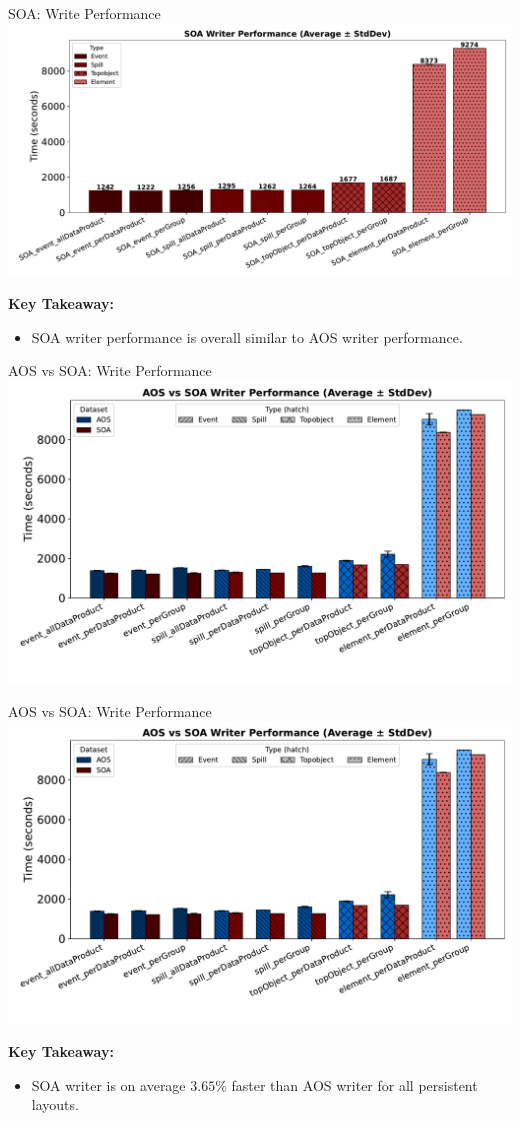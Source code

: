 \documentclass[aspectratio=169]{beamer}
\begin{document}
\begin{frame}{SOA: Write Performance}
  \centering
  \includegraphics[width=0.5\linewidth]{../experiments/Seaborn/SOAWriter_shaded.pdf}
  
  \textbf{Key Takeaway:}
  \begin{itemize}
  \item SOA writer performance is overall similar to AOS writer performance.

  \end{itemize}
\end{frame}


\begin{frame}{AOS vs SOA: Write Performance}
  \centering
  \includegraphics[width=0.8\linewidth]{../experiments/Seaborn/AOS_SOA_Writer_grouped_with_gaps.pdf}
\end{frame}

\begin{frame}{AOS vs SOA: Write Performance}
  \centering
  \includegraphics[width=0.5\linewidth]{../experiments/Seaborn/AOS_SOA_Writer_grouped_with_gaps.pdf}

  \textbf{Key Takeaway:}
  \begin{itemize}
  \item SOA writer is on average $3.65\%$ faster than AOS writer for all persistent layouts.

  \end{itemize}
\end{frame}
\end{document}
